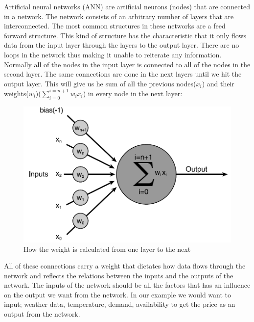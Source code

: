 Artificial neural networks (ANN) are artificial neurons (nodes) that are connected in a network. The network consists of an arbitrary number of layers that are interconnected. The most common structures in these networks are a feed forward structure. This kind of structure has the characteristic that it only flows data from the input layer through the layers to the output layer. There are no loops in the network thus making it unable to reiterate any information. Normally all of the nodes in the input layer is connected to all of the nodes in the second layer. The same connections are done in the next layers until we hit the output layer. This will give us he sum of all the previous nodes(\begin{math}x_i\end{math}) and their weights(\begin{math}w_i\end{math})(\begin{math}\sum_{i=0}^{i=n+1} w_i x_i \end{math}) in every node in the next layer:
\begin{figure}[weight!]
\centering
\includegraphics[width=0.8\linewidth,natwidth=898,natheight=587]{billeder/weight_of_layers.png}
\caption{How the weight is calculated from one layer to the next}
\label{fig:weight_of_layers}
\end{figure}
All of these connections carry a weight that dictates how data flows through the network and reflects the relations between the inputs and the outputs of the network. The inputs of the network should be all the factors that has an influence on the output we want from the network. In our example we would want to input; weather data, temperature, demand, availability \cite{21} to get the price as an output from the network.

